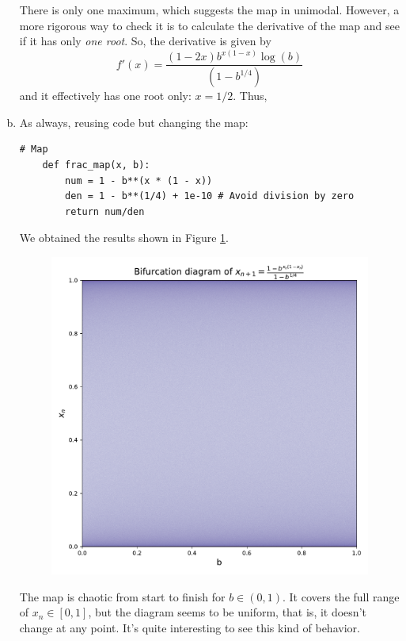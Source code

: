 \begin{enumerate}[(a)]
    There is only one maximum, which suggests the map in unimodal. However, a more rigorous way to
    check it is to calculate the derivative of the map and see if it has only \textit{one root}. So, the
    derivative is given by
    \[
    f'(x) = \frac{(1-2x)b^{x(1-x)}\log(b)}{(1-b^{1/4})}
    \]
    and it effectively has one root only: $x = 1/2$. Thus, 

    \item As always, reusing code but changing the map:
    \begin{lstlisting}[style=pythonstyle]
    # Map
    def frac_map(x, b):
        num = 1 - b**(x * (1 - x))
        den = 1 - b**(1/4) + 1e-10 # Avoid division by zero
        return num/den
    \end{lstlisting}
    We obtained the results shown in Figure \ref{fig:3b}.
    \newpage
    \begin{figure}[!ht]
        \centering
        \includegraphics[scale=0.65]{images/b_power.pdf}
        \label{fig:3b}
    \end{figure}

    The map is chaotic from start to finish for $b \in (0,1)$. It covers 
    the full range of $x_n \in [0,1]$, but the diagram seems to be uniform, that is, 
    it doesn't change at any point. It's quite interesting to see this kind of behavior.


\end{enumerate}
